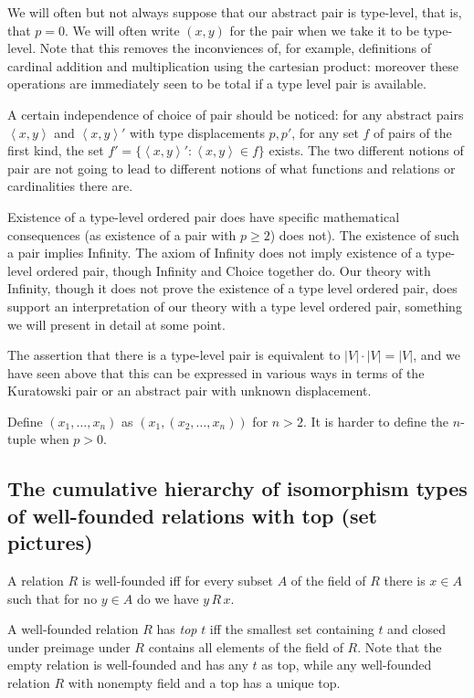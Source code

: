 \documentclass[12pt]{article}
\begin{document}
We will often but not always suppose that our abstract pair is type-level, that is, that $p=0$.  We will often write $(x,y)$ for the pair when we take it to be type-level.  Note that this removes the inconviences of, for example, definitions of cardinal addition and multiplication using the cartesian product:  moreover these operations are immediately seen to be total if a type level pair is available.

A certain independence of choice of pair should be noticed:  for any abstract pairs $\left<x,y\right>$ and $\left<x,y\right>'$ with type displacements $p, p'$, for any set $f$
of pairs of the first kind, the set $f' = \{\left<x,y\right>':\left<x,y\right> \in f\}$ exists.  The two different notions of pair are not going to lead to different notions of what functions and relations or cardinalities there are.

Existence of a type-level ordered pair does have specific mathematical consequences (as existence of a pair with $p \geq 2$) does not).  The existence of such a pair implies Infinity.  The axiom of Infinity does not imply existence of a type-level ordered pair, though Infinity and Choice together do.  Our theory with Infinity, though it does not prove the existence of a type level ordered pair, does support an interpretation of our theory with a type level ordered pair, something we will present in detail at some point.

The assertion that there is a type-level pair is equivalent to $|V| \cdot |V| = |V|$, and we have seen above that this can be expressed in various ways in terms of the Kuratowski pair or an abstract pair with unknown displacement.

Define $(x_1,\ldots,x_n)$ as $(x_1,(x_2,\ldots,x_n))$ for $n>2$.  It is harder to define the $n$-tuple when $p >0$.

\subsection{The cumulative hierarchy of isomorphism types of well-founded relations with top (set pictures)}

A relation $R$ is well-founded iff for every subset $A$ of the field of $R$ there is $x \in A$ such that for no $y \in A$ do we have $y \,R\,x$.

A well-founded relation $R$ has {\em top\/} $t$ iff the smallest set containing $t$ and closed under preimage under $R$ contains all elements of the field of $R$.  Note that the empty relation is well-founded and has
any $t$ as top, while any well-founded relation $R$ with nonempty field and a top has a unique top.
\end{document}
